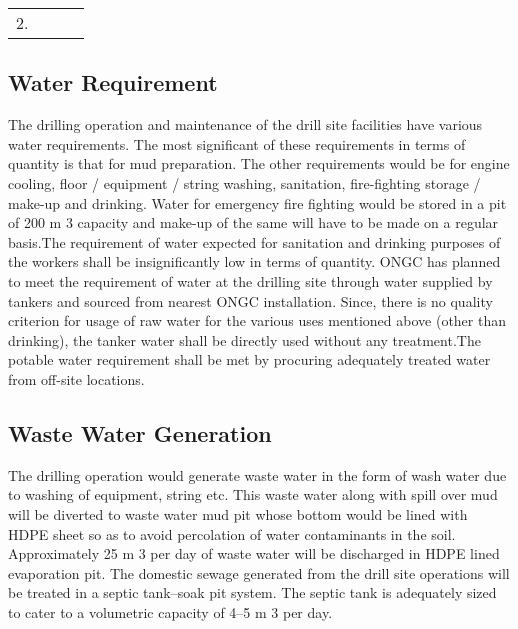\begin{table}
\begin{tabular}{|l|l|l|l|}
\multirow{2}{*}{2.} & \multirow{2}{*}{}                                                                                          &             &     \\ \cline{3-4} 
                    &                                                                                                            &             &     \\ \hline
\end{tabular}
\end{table}


\subsection{\textbf{Water Requirement}}

The drilling operation and maintenance of the drill site facilities have various water requirements. The most significant of these requirements in terms of quantity is that for mud preparation. The other requirements would be for engine cooling, floor / equipment / string washing, sanitation, fire-fighting storage / make-up and
drinking. Water for emergency fire fighting would be stored in a pit of 200 m 3 capacity and make-up of the same will have to be made on a regular basis.The requirement of water expected for sanitation and drinking purposes of the workers shall be insignificantly low in terms of quantity. ONGC has planned to meet the requirement of water at the drilling site through water supplied by tankers and sourced from nearest ONGC installation. Since, there is no quality criterion for usage of raw water for the various uses mentioned above (other than drinking), the tanker water shall be directly used without any treatment.The potable water requirement shall be met by procuring adequately treated water from off-site locations.

\subsection{\textbf{Waste Water Generation}}

The drilling operation would generate waste water in the form of wash water due to washing of equipment, string etc. This waste water along with spill over mud will be diverted to waste water mud pit whose bottom would be lined with HDPE sheet so as to avoid percolation of water contaminants in the soil. Approximately 25 m 3 per day of waste water will be discharged in HDPE lined evaporation pit. The domestic sewage generated from the drill site operations will be treated in a septic tank–soak pit system. The septic tank is adequately sized to cater to a volumetric capacity of 4–5 m 3 per day.

